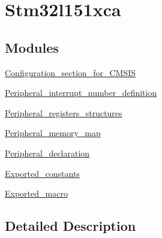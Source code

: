 \hypertarget{group__stm32l151xca}{\section{Stm32l151xca}
\label{group__stm32l151xca}
}
\subsection*{Modules}
\begin{DoxyCompactItemize}
\item 
\hyperlink{group___configuration__section__for___c_m_s_i_s}{Configuration\-\_\-section\-\_\-for\-\_\-\-C\-M\-S\-I\-S}
\item 
\hyperlink{group___peripheral__interrupt__number__definition}{Peripheral\-\_\-interrupt\-\_\-number\-\_\-definition}
\item 
\hyperlink{group___peripheral__registers__structures}{Peripheral\-\_\-registers\-\_\-structures}
\item 
\hyperlink{group___peripheral__memory__map}{Peripheral\-\_\-memory\-\_\-map}
\item 
\hyperlink{group___peripheral__declaration}{Peripheral\-\_\-declaration}
\item 
\hyperlink{group___exported__constants}{Exported\-\_\-constants}
\item 
\hyperlink{group___exported__macro}{Exported\-\_\-macro}
\end{DoxyCompactItemize}


\subsection{Detailed Description}
